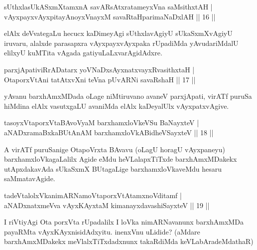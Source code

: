 \begin{shl}
sUthxlasUkASxmXtamxnA savARsAtxratameyxVna saMsithxtAH |\\
vAyxpayxvAyxpitayA\s noyxVnayxM savaRtaHparimaNaDxlAH \hfill || 16 ||
\end{shl}

\begin{artha}
elAlx deVvategaLu hecucx kaDimeyAgi sUthxlavAgiyU sUkaSxmXvAgiyU iruvaru, alalxde parasapxra vAyxpayxvAyxpaka rUpadiMda yAvudariMdalU elilxyU kuMTita vAgada gatiyuLaLxvarAgidAdxre.
\end{artha}


\begin{shl}
parxjApativiRrADatarx yoV\s NaDxsAyxnatxvayxRvasithxtaH |\\
OtaporxVtAni tatAtxvXni teVna pUvARNi savaRshaH \hfill || 17 ||
\end{shl}

\begin{artha}
yAvanu barxhAmxMDada oLage niMtiruvano avaneV parxjApati, virATf puruSa hiMdina elAlx vasutxgaLU avaniMda elAlx kaDeyalUlx vAyxpatxvAgive.
\end{artha}

\begin{shl}
tasoyxVtaporxVtaBAvoV\s yaM barxhamxloVkeVSu BaNayxteV |\\
aNADxramaBxkaBUtAnAM barxhamxloVkABidheVSayxteV \hfill || 18 ||
\end{shl}

\begin{artha}
A virATf puruSanige OtapoVrxta BAvavu (oLagU horagU vAyxpaneyu) barxhamxloVkagaLalilx Agide eMdu heVLalapxTiTxde barxhAmxMDakekx utApxdakavAda sUkaSxmX BUtagaLige barxhamxloVkaveMdu hesaru saMmatavAgide.
\end{artha}

\begin{shl}
tadeVtalolxVkanimARNamoVtaporxVtAtamxnoVditamf |\\
aNADxnatxmeVva vAyxKAyxtaM kimanayxdavashiSayxteV \hfill || 19 ||
\end{shl}

\begin{artha}
I riVtiyAgi Ota porxVta rUpadalilx I loVka nimARNavanunx barxhAmxMDa payaRMta vAyxKAyxnisidAdxyitu. inenxVnu uLidide? (aMdare barxhAmxMDakekx meVlalxTiTxdadxnunx takaRdiMda keVLabAradeMdathaR)
\end{artha}

